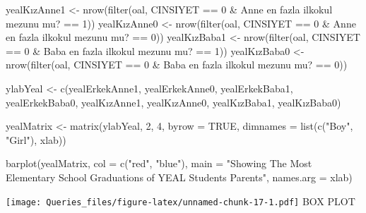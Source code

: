 \documentclass[
]{article}
\newenvironment{Shaded}{\begin{snugshade}}{\end{snugshade}}
\newcommand{\AttributeTok}[1]{\textcolor[rgb]{0.77,0.63,0.00}{#1}}
\newcommand{\ConstantTok}[1]{\textcolor[rgb]{0.00,0.00,0.00}{#1}}
\newcommand{\DecValTok}[1]{\textcolor[rgb]{0.00,0.00,0.81}{#1}}
\newcommand{\FunctionTok}[1]{\textcolor[rgb]{0.00,0.00,0.00}{#1}}
\newcommand{\NormalTok}[1]{#1}
\newcommand{\OtherTok}[1]{\textcolor[rgb]{0.56,0.35,0.01}{#1}}
\newcommand{\SpecialCharTok}[1]{\textcolor[rgb]{0.00,0.00,0.00}{#1}}
\newcommand{\StringTok}[1]{\textcolor[rgb]{0.31,0.60,0.02}{#1}}
\begin{document}
\begin{Shaded}
\begin{Highlighting}[]
\NormalTok{yealKızAnne1 }\OtherTok{\textless{}{-}} \FunctionTok{nrow}\NormalTok{(}\FunctionTok{filter}\NormalTok{(oal, CINSIYET }\SpecialCharTok{==} \DecValTok{0} \SpecialCharTok{\&} \StringTok{\textasciigrave{}}\AttributeTok{Anne en fazla ilkokul mezunu mu?}\StringTok{\textasciigrave{}} \SpecialCharTok{==} \DecValTok{1}\NormalTok{))}
\NormalTok{yealKızAnne0 }\OtherTok{\textless{}{-}} \FunctionTok{nrow}\NormalTok{(}\FunctionTok{filter}\NormalTok{(oal, CINSIYET }\SpecialCharTok{==} \DecValTok{0} \SpecialCharTok{\&} \StringTok{\textasciigrave{}}\AttributeTok{Anne en fazla ilkokul mezunu mu?}\StringTok{\textasciigrave{}} \SpecialCharTok{==} \DecValTok{0}\NormalTok{))}
\NormalTok{yealKızBaba1 }\OtherTok{\textless{}{-}} \FunctionTok{nrow}\NormalTok{(}\FunctionTok{filter}\NormalTok{(oal, CINSIYET }\SpecialCharTok{==} \DecValTok{0} \SpecialCharTok{\&} \StringTok{\textasciigrave{}}\AttributeTok{Baba en fazla ilkokul mezunu mu?}\StringTok{\textasciigrave{}} \SpecialCharTok{==} \DecValTok{1}\NormalTok{))}
\NormalTok{yealKızBaba0 }\OtherTok{\textless{}{-}} \FunctionTok{nrow}\NormalTok{(}\FunctionTok{filter}\NormalTok{(oal, CINSIYET }\SpecialCharTok{==} \DecValTok{0} \SpecialCharTok{\&} \StringTok{\textasciigrave{}}\AttributeTok{Baba en fazla ilkokul mezunu mu?}\StringTok{\textasciigrave{}} \SpecialCharTok{==} \DecValTok{0}\NormalTok{))}

\NormalTok{ylabYeal }\OtherTok{\textless{}{-}} \FunctionTok{c}\NormalTok{(yealErkekAnne1, yealErkekAnne0, yealErkekBaba1, yealErkekBaba0,}
\NormalTok{              yealKızAnne1, yealKızAnne0, yealKızBaba1, yealKızBaba0)}

\NormalTok{yealMatrix }\OtherTok{\textless{}{-}} \FunctionTok{matrix}\NormalTok{(ylabYeal, }\DecValTok{2}\NormalTok{, }\DecValTok{4}\NormalTok{, }\AttributeTok{byrow =} \ConstantTok{TRUE}\NormalTok{, }\AttributeTok{dimnames =} \FunctionTok{list}\NormalTok{(}\FunctionTok{c}\NormalTok{(}\StringTok{"Boy"}\NormalTok{, }\StringTok{"Girl"}\NormalTok{), xlab))}

\FunctionTok{barplot}\NormalTok{(yealMatrix, }\AttributeTok{col =} \FunctionTok{c}\NormalTok{(}\StringTok{"red"}\NormalTok{, }\StringTok{"blue"}\NormalTok{), }\AttributeTok{main =} \StringTok{"Showing The Most Elementary School Graduations of YEAL Students\textquotesingle{} Parents"}\NormalTok{, }\AttributeTok{names.arg =}\NormalTok{ xlab)}
\end{Highlighting}
\end{Shaded}

\texttt{[image: Queries\_files/figure-latex/unnamed-chunk-17-1.pdf]} BOX
PLOT
\end{document}
